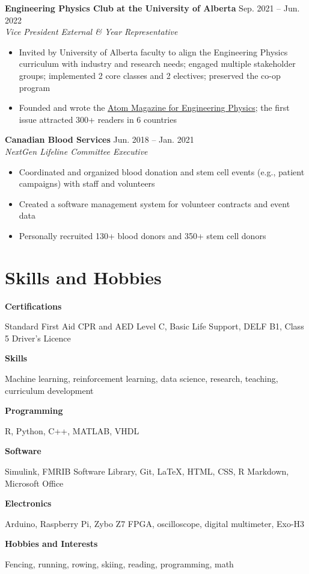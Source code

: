 \documentclass{article}
\begin{document}
\textbf{Engineering Physics Club at the University of Alberta} \hfill Sep. 2021 -- Jun. 2022 \\
\textit{Vice President External \& Year Representative}
\begin{itemize}
    \item Invited by University of Alberta faculty to align the Engineering Physics curriculum with industry and research needs; engaged multiple stakeholder groups; implemented 2 core classes and 2 electives; preserved the co-op program
    \item Founded and wrote the \href{https://atom-winter-2022.netlify.app/}{Atom Magazine for Engineering Physics}; the first issue attracted 300+ readers in 6 countries
\end{itemize} \vspace{1em}

\textbf{Canadian Blood Services} \hfill Jun. 2018 -- Jan. 2021 \\
\textit{NextGen Lifeline Committee Executive}
\begin{itemize}
    \item Coordinated and organized blood donation and stem cell events (e.g., patient campaigns) with staff and volunteers
    \item Created a software management system for volunteer contracts and event data
    \item Personally recruited 130+ blood donors and 350+ stem cell donors
\end{itemize}


\section*{\textcolor{my_colour}{Skills and Hobbies}}
\vspace{-.25em} \hrulefill \vspace{.25em}

\textbf{Certifications} \hfill \parbox[t]{.8\linewidth}{Standard First Aid CPR and AED Level C, Basic Life Support, DELF B1, Class 5 Driver's Licence}

\textbf{Skills} \hfill \parbox[t]{.8\linewidth}{Machine learning, reinforcement learning, data science, research, teaching, curriculum development}

\textbf{Programming} \hfill \parbox[t]{.8\linewidth}{R, Python, C++, MATLAB, VHDL}

\textbf{Software} \hfill \parbox[t]{0.8\linewidth}{Simulink, FMRIB Software Library, Git, \LaTeX, HTML, CSS, R Markdown, Microsoft Office}

\textbf{Electronics} \hfill \parbox[t]{0.8\linewidth}{Arduino, Raspberry Pi, Zybo Z7 FPGA, oscilloscope, digital multimeter, Exo-H3}

\textbf{Hobbies and Interests} \hfill \parbox[t]{.8\linewidth}{Fencing, running, rowing, skiing, reading, programming, math}
\end{document}
